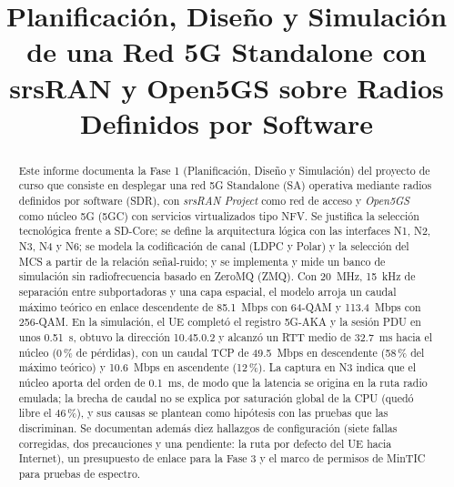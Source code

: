 \documentclass[conference]{IEEEtran}
\begin{document}
\title{Planificación, Diseño y Simulación de una Red 5G Standalone con srsRAN y Open5GS sobre Radios Definidos por Software}

\author{
}

\maketitle

\begin{abstract}
Este informe documenta la Fase 1 (Planificación, Diseño y Simulación) del proyecto de curso que consiste en desplegar una red 5G Standalone (SA) operativa mediante radios definidos por software (SDR), con \textit{srsRAN Project} como red de acceso y \textit{Open5GS} como núcleo 5G (5GC) con servicios virtualizados tipo NFV. Se justifica la selección tecnológica frente a SD-Core; se define la arquitectura lógica con las interfaces N1, N2, N3, N4 y N6; se modela la codificación de canal (LDPC y Polar) y la selección del MCS a partir de la relación señal-ruido; y se implementa y mide un banco de simulación sin radiofrecuencia basado en ZeroMQ (ZMQ). Con 20~MHz, 15~kHz de separación entre subportadoras y una capa espacial, el modelo arroja un caudal máximo teórico en enlace descendente de 85.1~Mbps con 64-QAM y 113.4~Mbps con 256-QAM. En la simulación, el UE completó el registro 5G-AKA y la sesión PDU en unos 0.51~s, obtuvo la dirección 10.45.0.2 y alcanzó un RTT medio de 32.7~ms hacia el núcleo (0\,\% de pérdidas), con un caudal TCP de 49.5~Mbps en descendente (58\,\% del máximo teórico) y 10.6~Mbps en ascendente (12\,\%). La captura en N3 indica que el núcleo aporta del orden de 0.1~ms, de modo que la latencia se origina en la ruta radio emulada; la brecha de caudal no se explica por saturación global de la CPU (quedó libre el 46\,\%), y sus causas se plantean como hipótesis con las pruebas que las discriminan.
Se documentan además diez hallazgos de configuración (siete fallas corregidas, dos precauciones y una pendiente: la ruta por defecto del UE hacia Internet), un presupuesto de enlace para la Fase 3 y el marco de permisos de MinTIC para pruebas de espectro.
\end{abstract}
\end{document}
